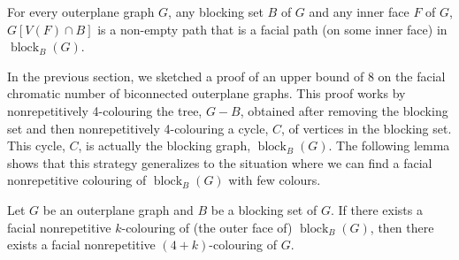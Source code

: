 \documentclass{patmorin}
\DeclareMathOperator{\block}{block}
\begin{document}
\begin{obs}
  For every outerplane graph $G$, any blocking set $B$ of $G$ and any
  inner face $F$ of $G$, $G[V(F)\cap B]$ is a non-empty path that is a
  facial path (on some inner face)  in $\block_B(G)$.
\end{obs}

In the previous section, we sketched a proof of an upper bound of 8 on
the facial chromatic number of biconnected outerplane graphs.  This proof
works by nonrepetitively 4-colouring the tree, $G-B$, obtained after
removing the blocking set and then nonrepetitively 4-colouring a cycle,
$C$, of vertices in the blocking set.  This cycle, $C$, is actually
the blocking graph, $\block_B(G)$.  The following lemma shows that
this strategy generalizes to the situation where we can find a facial
nonrepetitive colouring of $\block_B(G)$ with few colours.

\begin{lem}
  Let $G$ be an outerplane graph and $B$ be a blocking set of $G$. If
  there exists a facial nonrepetitive $k$-colouring of (the outer 
  face of) $\block_{B}(G)$, then there exists a facial nonrepetitive
  $(4+k)$-colouring of $G$.
\end{lem}
\end{document}
